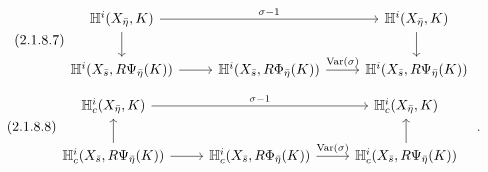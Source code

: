 \begin{equation}\tag{2.1.8.7}
\begin{tikzcd}
\mathbb{H}^i(X_{\bar{\eta}}, K) \arrow[rr, "\sigma-1"] \arrow[d] & {} & \mathbb{H}^i(X_{\bar{\eta}}, K) \arrow[d] \\
\mathbb{H}^i(X_{\bar{s}}, R\Psi_{\bar{\eta}}(K)) \arrow[r] & \mathbb{H}^i(X_{\bar{s}}, R\Phi_{\bar{\eta}}(K)) \arrow[r, "\mathrm{Var}(\sigma)"] & \mathbb{H}^i(X_{\bar{s}}, R\Psi_{\bar{\eta}}(K))
\end{tikzcd}
\end{equation}
\begin{equation}\tag{2.1.8.8}
\begin{tikzcd}
\mathbb{H}^i_c(X_{\bar{\eta}}, K) \arrow[rr, "\sigma-1"] & {} & \mathbb{H}^i_c(X_{\bar{\eta}}, K) \\
\mathbb{H}^i_c(X_{\bar{s}}, R\Psi_{\bar{\eta}}(K)) \arrow[r] \arrow[u] & \mathbb{H}^i_c(X_{\bar{s}}, R\Phi_{\bar{\eta}}(K)) \arrow[r, "\mathrm{Var}(\sigma)"] & \mathbb{H}^i_c(X_{\bar{s}}, R\Psi_{\bar{\eta}}(K)) \arrow[u]
\end{tikzcd}\quad .
\end{equation}
